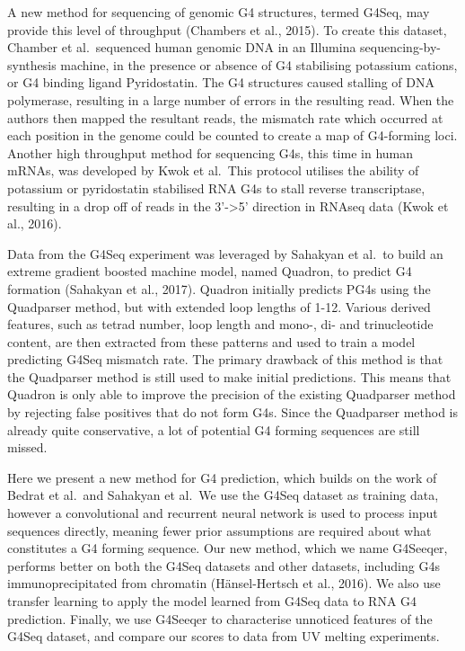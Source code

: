 \documentclass[12pt,a4paper,]{report}
\begin{document}
A new method for sequencing of genomic G4 structures, termed G4Seq, may
provide this level of throughput (Chambers et al., 2015). To create this
dataset, Chamber et al.~sequenced human genomic DNA in an Illumina
sequencing-by-synthesis machine, in the presence or absence of G4
stabilising potassium cations, or G4 binding ligand Pyridostatin. The G4
structures caused stalling of DNA polymerase, resulting in a large
number of errors in the resulting read. When the authors then mapped the
resultant reads, the mismatch rate which occurred at each position in
the genome could be counted to create a map of G4-forming loci. Another
high throughput method for sequencing G4s, this time in human mRNAs, was
developed by Kwok et al.~This protocol utilises the ability of potassium
or pyridostatin stabilised RNA G4s to stall reverse transcriptase,
resulting in a drop off of reads in the 3'-\textgreater{}5' direction in
RNAseq data (Kwok et al., 2016).

Data from the G4Seq experiment was leveraged by Sahakyan et al.~to build
an extreme gradient boosted machine model, named Quadron, to predict G4
formation (Sahakyan et al., 2017). Quadron initially predicts PG4s using
the Quadparser method, but with extended loop lengths of 1-12. Various
derived features, such as tetrad number, loop length and mono-, di- and
trinucleotide content, are then extracted from these patterns and used
to train a model predicting G4Seq mismatch rate. The primary drawback of
this method is that the Quadparser method is still used to make initial
predictions. This means that Quadron is only able to improve the
precision of the existing Quadparser method by rejecting false positives
that do not form G4s. Since the Quadparser method is already quite
conservative, a lot of potential G4 forming sequences are still missed.

Here we present a new method for G4 prediction, which builds on the work
of Bedrat et al.~and Sahakyan et al.~We use the G4Seq dataset as
training data, however a convolutional and recurrent neural network is
used to process input sequences directly, meaning fewer prior
assumptions are required about what constitutes a G4 forming sequence.
Our new method, which we name G4Seeqer, performs better on both the
G4Seq datasets and other datasets, including G4s immunoprecipitated from
chromatin (Hänsel-Hertsch et al., 2016). We also use transfer learning
to apply the model learned from G4Seq data to RNA G4 prediction.
Finally, we use G4Seeqer to characterise unnoticed features of the G4Seq
dataset, and compare our scores to data from UV melting experiments.
\end{document}
